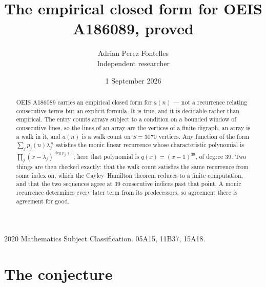 \documentclass[11pt,a4paper]{article}
\title{The empirical closed form for OEIS A186089, proved}
\author{Adrian Perez Fontelles\\ \small Independent researcher}
\date{1 September 2026}
\theoremstyle{plain}
\theoremstyle{definition}
\begin{document}
\maketitle

\begin{abstract}
OEIS A186089 carries an empirical closed form for $a(n)$ --- not a recurrence relating
consecutive terms but an explicit formula. It is true, and it is decidable rather than
empirical. The entry counts arrays subject to a condition on a bounded window of consecutive lines, so the lines of an array are the
vertices of a finite digraph, an array is a walk in it, and $a(n)$ is a walk count on
$S=3070$ vertices. Any function of the form $\sum_j p_j(n)\lambda_j^{\,n}$ satisfies the
monic linear recurrence whose characteristic polynomial is
$\prod_j(x-\lambda_j)^{\deg p_j+1}$; here that polynomial is $q(x)=(x-1)^{39}$, of degree
$39$. Two things are then checked exactly: that the walk count satisfies the same
recurrence from some index on, which the Cayley--Hamilton theorem reduces to a finite
computation, and that the two sequences agree at $39$ consecutive indices past that
point. A monic recurrence determines every later term from its predecessors, so agreement
there is agreement for good.
\end{abstract}

\noindent\small 2020 Mathematics Subject Classification. 05A15, 11B37, 15A18.\normalsize

\section{The conjecture}
\end{document}
